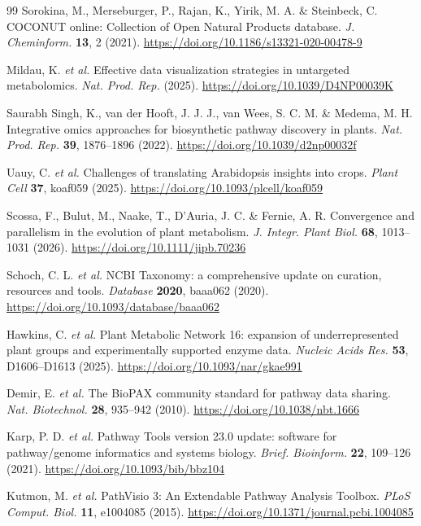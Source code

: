 \documentclass[11pt,a4paper]{article}
\begin{document}
\begin{thebibliography}{99}
Sorokina, M., Merseburger, P., Rajan, K., Yirik, M. A. \& Steinbeck, C. COCONUT online: Collection of Open Natural Products database. \textit{J. Cheminform.} \textbf{13}, 2 (2021). \url{https://doi.org/10.1186/s13321-020-00478-9}

Mildau, K. \textit{et al.} Effective data visualization strategies in untargeted metabolomics. \textit{Nat. Prod. Rep.} (2025). \url{https://doi.org/10.1039/D4NP00039K}

Saurabh Singh, K., van der Hooft, J. J. J., van Wees, S. C. M. \& Medema, M. H. Integrative omics approaches for biosynthetic pathway discovery in plants. \textit{Nat. Prod. Rep.} \textbf{39}, 1876--1896 (2022). \url{https://doi.org/10.1039/d2np00032f}

Uauy, C. \textit{et al.} Challenges of translating Arabidopsis insights into crops. \textit{Plant Cell} \textbf{37}, koaf059 (2025). \url{https://doi.org/10.1093/plcell/koaf059}

Scossa, F., Bulut, M., Naake, T., D'Auria, J. C. \& Fernie, A. R. Convergence and parallelism in the evolution of plant metabolism. \textit{J. Integr. Plant Biol.} \textbf{68}, 1013--1031 (2026). \url{https://doi.org/10.1111/jipb.70236}

Schoch, C. L. \textit{et al.} NCBI Taxonomy: a comprehensive update on curation, resources and tools. \textit{Database} \textbf{2020}, baaa062 (2020). \url{https://doi.org/10.1093/database/baaa062}

Hawkins, C. \textit{et al.} Plant Metabolic Network 16: expansion of underrepresented plant groups and experimentally supported enzyme data. \textit{Nucleic Acids Res.} \textbf{53}, D1606--D1613 (2025). \url{https://doi.org/10.1093/nar/gkae991}

Demir, E. \textit{et al.} The BioPAX community standard for pathway data sharing. \textit{Nat. Biotechnol.} \textbf{28}, 935--942 (2010). \url{https://doi.org/10.1038/nbt.1666}

Karp, P. D. \textit{et al.} Pathway Tools version 23.0 update: software for pathway/genome informatics and systems biology. \textit{Brief. Bioinform.} \textbf{22}, 109--126 (2021). \url{https://doi.org/10.1093/bib/bbz104}

Kutmon, M. \textit{et al.} PathVisio 3: An Extendable Pathway Analysis Toolbox. \textit{PLoS Comput. Biol.} \textbf{11}, e1004085 (2015). \url{https://doi.org/10.1371/journal.pcbi.1004085}


\end{thebibliography}
\end{document}
